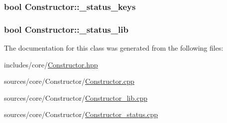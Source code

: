 \subsubsection[{\+\_\+status\+\_\+keys}]{\setlength{\rightskip}{0pt plus 5cm}bool Constructor\+::\+\_\+status\+\_\+keys\hspace{0.3cm}{\ttfamily [private]}}\label{class_constructor_ae6c63a19938b9afbad0e0f981d298bcc}
\hypertarget{class_constructor_af59e3f7a517821f74d0bd2d290efc850}{}
\subsubsection[{\+\_\+status\+\_\+lib}]{\setlength{\rightskip}{0pt plus 5cm}bool Constructor\+::\+\_\+status\+\_\+lib\hspace{0.3cm}{\ttfamily [private]}}\label{class_constructor_af59e3f7a517821f74d0bd2d290efc850}


The documentation for this class was generated from the following files\+:\begin{DoxyCompactItemize}
\item 
includes/core/\hyperlink{_constructor_8hpp}{Constructor.\+hpp}\item 
sources/core/\+Constructor/\hyperlink{_constructor_8cpp}{Constructor.\+cpp}\item 
sources/core/\+Constructor/\hyperlink{_constructor__lib_8cpp}{Constructor\+\_\+lib.\+cpp}\item 
sources/core/\+Constructor/\hyperlink{_constructor__status_8cpp}{Constructor\+\_\+status.\+cpp}\end{DoxyCompactItemize}
